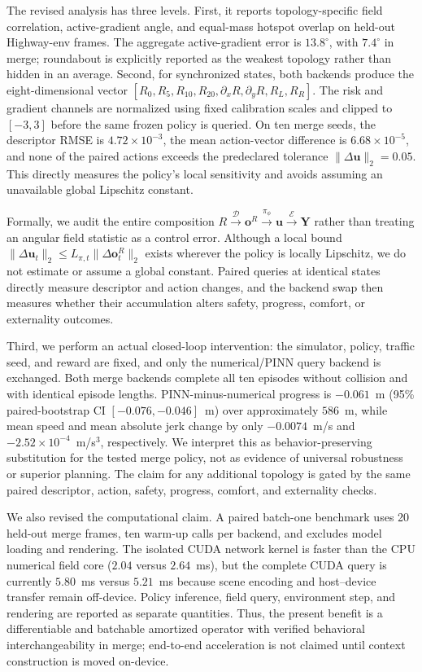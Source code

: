 The revised analysis has three levels. First, it reports topology-specific
field correlation, active-gradient angle, and equal-mass hotspot overlap on
held-out Highway-env frames. The aggregate active-gradient error is
$13.8^{\circ}$, with $7.4^{\circ}$ in merge; roundabout is explicitly reported
as the weakest topology rather than hidden in an average. Second, for
synchronized states, both backends produce the eight-dimensional vector
$[R_{0},R_{5},R_{10},R_{20},\partial_xR,\partial_yR,R_L,R_R]$. The risk and
gradient channels are normalized using fixed calibration scales and clipped
to $[-3,3]$ before the same frozen policy is queried. On ten merge seeds, the
descriptor RMSE is $4.72\times10^{-3}$, the mean action-vector difference is
$6.68\times10^{-5}$, and none of the paired actions exceeds the predeclared
tolerance $\lVert\Delta\mathbf{u}\rVert_2=0.05$. This directly measures the
policy's local sensitivity and avoids assuming an unavailable global
Lipschitz constant.

Formally, we audit the entire composition
$R\xrightarrow{\mathcal D}\mathbf{o}^{R}
\xrightarrow{\pi_{\phi}}\mathbf{u}\xrightarrow{\mathcal E}\mathbf{Y}$ rather
than treating an angular field statistic as a control error. Although a local
bound $\|\Delta\mathbf{u}_{t}\|_{2}\leq
L_{\pi,t}\|\Delta\mathbf{o}^{R}_{t}\|_{2}$ exists wherever the policy is
locally Lipschitz, we do not estimate or assume a global constant. Paired
queries at identical states directly measure descriptor and action changes,
and the backend swap then measures whether their accumulation alters safety,
progress, comfort, or externality outcomes.

Third, we perform an actual closed-loop intervention: the simulator, policy,
traffic seed, and reward are fixed, and only the numerical/PINN query backend
is exchanged. Both merge backends complete all ten episodes without collision
and with identical episode lengths. PINN-minus-numerical progress is
$-0.061$~m (95\% paired-bootstrap CI $[-0.076,-0.046]$~m) over approximately
$586$~m, while mean speed and mean absolute jerk change by only
$-0.0074$~m/s and $-2.52\times10^{-4}$~m/s$^3$, respectively. We interpret
this as behavior-preserving substitution for the tested merge policy, not as
evidence of universal robustness or superior planning. The claim for any
additional topology is gated by the same paired descriptor, action, safety,
progress, comfort, and externality checks.

We also revised the computational claim. A paired batch-one benchmark uses 20
held-out merge frames, ten warm-up calls per backend, and excludes model
loading and rendering. The isolated CUDA network kernel is faster than the CPU
numerical field core ($2.04$ versus $2.64$~ms), but the complete CUDA query is
currently $5.80$~ms versus $5.21$~ms because scene encoding and host--device
transfer remain off-device. Policy inference, field query, environment step,
and rendering are reported as separate quantities. Thus, the present benefit
is a differentiable and batchable amortized operator with verified behavioral
interchangeability in merge; end-to-end acceleration is not claimed until
context construction is moved on-device.

